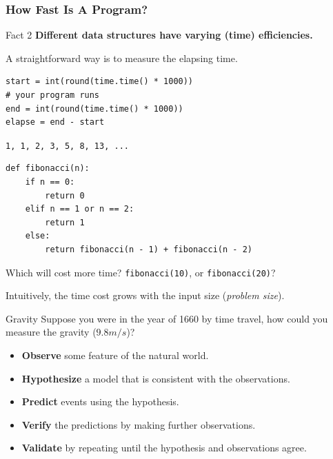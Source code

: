 \documentclass[aspectratio=169, 14pt]{beamer}
\begin{document}
\begin{frame}[fragile]
    \frametitle{How Fast Is A Program?}
    \begin{block}{Fact 2}
        \textbf{Different data structures have varying (time) \alert{efficiencies}.}
    \end{block} 
A straightforward way is to measure the elapsing time.
\begin{verbatim}
start = int(round(time.time() * 1000))
# your program runs
end = int(round(time.time() * 1000))
elapse = end - start    
\end{verbatim}
\end{frame}

\begin{frame}[fragile]
\texttt{1, 1, 2, 3, 5, 8, 13, ...}
    \begin{verbatim}
def fibonacci(n):
    if n == 0:
        return 0
    elif n == 1 or n == 2:
        return 1
    else:
        return fibonacci(n - 1) + fibonacci(n - 2)        
    \end{verbatim}
Which will cost more time? \texttt{fibonacci(10)}, or \texttt{fibonacci(20)}? 

Intuitively, the time cost grows with the input size (\emph{problem size}).
\end{frame}

\begin{frame}
\begin{block}{Gravity}
    Suppose you were in the year of 1660 by time travel, how could you measure the gravity ($9.8 m/s$)?
\end{block}
\pause
    \begin{itemize}
        \item \textbf{Observe} some feature of the natural world.
        \item \textbf{Hypothesize} a model that is consistent with the observations.
        \item \textbf{Predict} events using the hypothesis.
        \item \textbf{Verify} the predictions by making further observations.
        \item \textbf{Validate} by repeating until the hypothesis and observations agree.
    \end{itemize}

\end{frame}
\end{document}
